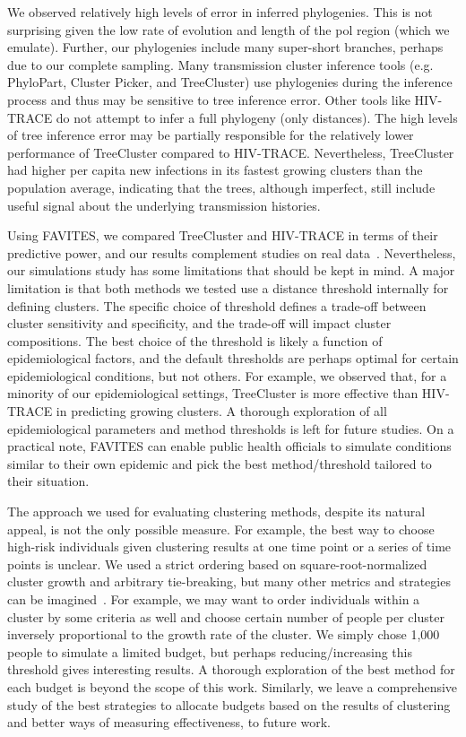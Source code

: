 We observed relatively high levels of error in inferred phylogenies. This is not surprising given the low rate of evolution and length of the \gls{pol} region (which we emulate). Further, our phylogenies include many super-short branches, perhaps due to our complete sampling. Many transmission cluster inference tools (e.g. PhyloPart, Cluster Picker, and TreeCluster) use phylogenies during the inference process and thus may be sensitive to tree inference error. Other tools like HIV-TRACE do not attempt to infer a full phylogeny (only distances). The high levels of tree inference error may be partially responsible for the relatively lower performance of TreeCluster compared to HIV-TRACE. Nevertheless, TreeCluster had higher per capita new infections in its fastest growing clusters than the population average, indicating that the trees, although imperfect, still include useful signal about the underlying transmission histories.

Using FAVITES, we compared TreeCluster and HIV-TRACE in terms of their predictive power, and our results complement studies on real data~\cite{Rose2017}. Nevertheless, our simulations study has some limitations that should be kept in mind. A major limitation is that both methods we tested use a distance threshold internally for defining clusters. The specific choice of threshold defines a trade-off between cluster sensitivity and specificity, and the trade-off will impact cluster compositions. The best choice of the threshold is likely a function of epidemiological factors, and the default thresholds are perhaps optimal for certain epidemiological conditions, but not others. For example, we observed that, for a minority of our epidemiological settings, TreeCluster is more effective than HIV-TRACE in predicting growing clusters. A thorough exploration of all epidemiological parameters and method thresholds is left for future studies. On a practical note, FAVITES can enable public health officials to simulate conditions similar to their own epidemic and pick the best method/threshold tailored to their situation.

The approach we used for evaluating clustering methods, despite its natural appeal, is not the only possible measure. For example, the best way to choose high-risk individuals given clustering results at one time point or a series of time points is unclear. We used a strict ordering based on square-root-normalized cluster growth and arbitrary tie-breaking, but many other metrics and strategies can be imagined~\cite{Wertheim2018}. For example, we may want to order individuals within a cluster by some criteria as well and choose certain number of people per cluster inversely proportional to the growth rate of the cluster. We simply chose 1,000 people to simulate a limited budget, but perhaps reducing/increasing this threshold
gives interesting results. A thorough exploration of the best method for each budget is beyond the scope of this work. Similarly, we leave a comprehensive study of the best strategies to allocate budgets based on the results of clustering and better ways of measuring effectiveness, to future work.

